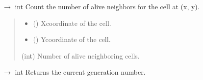 \documentclass[letterpaper,10pt,oneside,english]{sphinxhowto}
\begin{document}
\begin{fulllineitems}
\begin{fulllineitems}
\end{fulllineitems}


\begin{fulllineitems}
\label{\detokenize{core:core.game_of_life.GameOfLife.count_alive_neighbors}}
\pysigstartsignatures
\pysiglinewithargsret
{}
{\sphinxparamcomma {}}
{{ $\rightarrow$ int}}
\pysigstopsignatures
\sphinxAtStartPar
Count the number of alive neighbors for the cell at (x, y).
\begin{quote}\begin{description}
\begin{itemize}
\item {} 
\sphinxAtStartPar
{} () \textendash{} X\sphinxhyphen{}coordinate of the cell.

\item {} 
\sphinxAtStartPar
{} () \textendash{} Y\sphinxhyphen{}coordinate of the cell.

\end{itemize}

\sphinxAtStartPar
(int) Number of alive neighboring cells.

\end{description}\end{quote}

\end{fulllineitems}


\begin{fulllineitems}
\label{\detokenize{core:core.game_of_life.GameOfLife.get_generation}}
\pysigstartsignatures
\pysiglinewithargsret
{}
{}
{{ $\rightarrow$ int}}
\pysigstopsignatures
\sphinxAtStartPar
Returns the current generation number.

\end{fulllineitems}


\end{fulllineitems}
\end{document}
